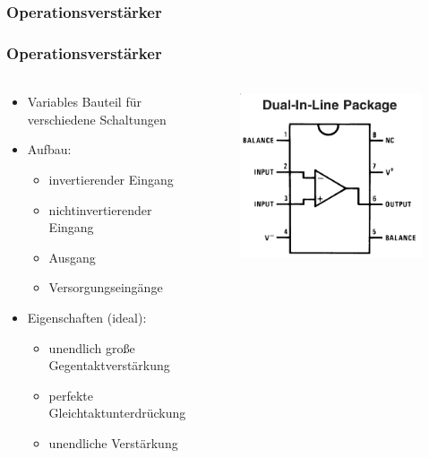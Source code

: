 \subsubsection{Operationsverstärker} %
\label{ssub:Operationsverstärker}

\begin{frame}
    \frametitle{Operationsverstärker}
    \framesubtitle{}
    \begin{columns}[c]
    \begin{block}{}
        \begin{itemize}
            \item Variables Bauteil für verschiedene Schaltungen
            \item Aufbau:
                \begin{itemize}
                    \item invertierender Eingang
                    \item nichtinvertierender Eingang
                    \item Ausgang
                    \item Versorgungseingänge
                \end{itemize}
            \item Eigenschaften (ideal):
                \begin{itemize}
                    \item unendlich große Gegentaktverstärkung
                    \item perfekte Gleichtaktunterdrückung 
                    \item unendliche Verstärkung
                \end{itemize}
        \end{itemize}
    \end{block}
    \begin{figure}[H]
    \begin{center}
            \includegraphics[scale=0.2]{./img/misc/opv_pins.png}

\end{center}
\end{figure}
\end{columns}
\end{frame}
